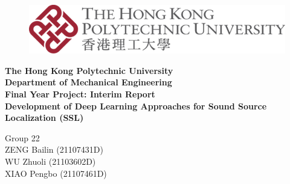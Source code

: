 \thispagestyle{empty}
\begin{center}

\begin{figure}
    \centering
    \includegraphics[width=0.75\linewidth]{figures/PolyU.png}
\end{figure}


\LARGE

\textbf{The Hong Kong Polytechnic University \\
Department of Mechanical Engineering \\
Final Year Project: Interim Report \\}
\vspace{1cm}
\textbf{Development of Deep Learning Approaches for Sound Source Localization (SSL)}
\vspace{1cm}

Group 22\\
\vspace{1cm}
ZENG Bailin (21107431D)\\
WU Zhuoli (21103602D)\\
XIAO Pengbo (21107461D)




\end{center}